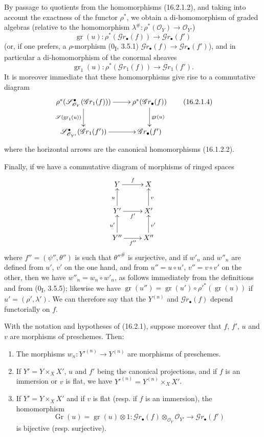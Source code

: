 \begin{env}[16.2.1]
By passage to quotients from the homomorphisms (16.2.1.2), and taking
into account the exactness of the functor $\rho^*$, we obtain a di-homomorphism
of graded algebras (relative to the homomorphism
$\lambda^\#:\rho^*(\mathcal{O}_Y)\to\mathcal{O}_{Y'}$)
\[
  \operatorname{gr}(u):
  \rho^*(\mathscr{G}r_\bullet(f))
  \longrightarrow\mathscr{G}r_\bullet(f')
  \tag{16.2.1.3}
  \label{IV.16.2.1.3}
\]
(or, if one prefers, a $\rho$-morphism (0\textsubscript{I}, 3.5.1)
$\mathscr{G}r_\bullet(f)\to\mathscr{G}r_\bullet(f')$), and in particular a
di-homomorphism of the conormal sheaves
\[
  \operatorname{gr}_1(u):
  \rho^*(\mathscr{G}r_1(f))\longrightarrow\mathscr{G}r_1(f').
\]
It is moreover immediate that these homomorphisms give rise to a commutative
diagram
\[
  \xymatrix{
    \rho^*(\mathscr{S}_{\mathcal{O}_Y}^{\bullet}
      (\mathscr{G}r_1(f)))
      \ar[r] \ar[d]_-{\mathscr{S}(\operatorname{gr}_1(u))}
      & \rho^*(\mathscr{G}r_\bullet(f))
        \ar[d]^-{\operatorname{gr}(u)} \\
    \mathscr{S}_{\mathcal{O}_{Y'}}^{\bullet}
      (\mathscr{G}r_1(f'))
      \ar[r]
      & \mathscr{G}r_\bullet(f')
  }
  \tag{16.2.1.4}
  \label{IV.16.2.1.4}
\]
where the horizontal arrows are the canonical homomorphisms (16.1.2.2).

Finally, if we have a commutative diagram of morphisms of ringed spaces
\[
  \xymatrix{
    Y \ar[r]^f & X \\
    Y' \ar[r]_{f'} \ar[u]^u & X' \ar[u]_v \\
    Y'' \ar[r]_{f''} \ar[u]^{u'} & X'' \ar[u]_{v'}
  }
\]
where $f''=(\psi'',\theta'')$ is such that $\theta''^\#$ is surjective, and if
$w'_n$ and $w''_n$ are defined from $u'$, $v'$ on the one hand, and from
$u''=u\circ u'$, $v''=v\circ v'$ on the other, then we have
$w''_n=w_n\circ w'_n$, as follows immediately from the definitions and from
(0\textsubscript{I}, 3.5.5); likewise we have
$\operatorname{gr}(u'')=
\operatorname{gr}(u')\circ\rho'^*(\operatorname{gr}(u))$ if
$u'=(\rho',\lambda')$. We can therefore say that the $Y^{(n)}$ and
$\mathscr{G}r_\bullet(f)$ depend functorially on $f$.
\end{env}

\begin{proposition}[16.2.2]
\label{IV.16.2.2}
With the notation and hypotheses of (16.2.1), suppose moreover that $f$, $f'$,
$u$ and $v$ are morphisms of preschemes. Then:
\begin{enumerate}
\item[(i)] The morphisms $w_n:Y'^{(n)}\to Y^{(n)}$ are morphisms of
preschemes.
\item[(ii)] If $Y'=Y\times_X X'$, $u$ and $f'$ being the canonical
projections, and if $f$ is an immersion or $v$ is flat, we have
$Y'^{(n)}=Y^{(n)}\times_X X'$.
\item[(iii)] If $Y'=Y\times_X X'$ and if $v$ is flat (resp. if $f$ is an
immersion), the homomorphism
\[
  \operatorname{Gr}(u)=\operatorname{gr}(u)\otimes 1:
  \mathscr{G}r_\bullet(f)\otimes_{\mathcal{O}_Y}\mathcal{O}_{Y'}
  \longrightarrow\mathscr{G}r_\bullet(f')
\]
is bijective (resp. surjective).
\end{enumerate}
\end{proposition}

